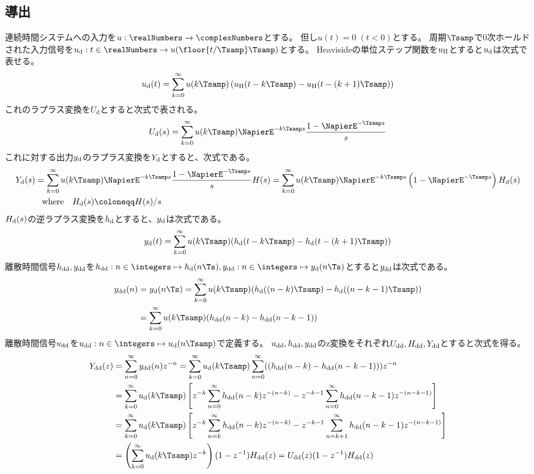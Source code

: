         \subsection{導出}
            連続時間システムへの入力を$u:\realNumbers\to\complexNumbers$とする。
            但し$u(t)=0\;(t<0)$とする。
            周期$\Tsamp$で0次ホールドされた入力信号を$\ud:t\in\realNumbers\to u(\floor{t/\Tsamp}\Tsamp)$とする。
            Heavisideの単位ステップ関数を$u_\text{H}$とすると$u_\text{d}$は次式で表せる。
            \[ \ud(t) = \sum_{k=0}^\infty u(k\Tsamp)\left(\uH(t-k\Tsamp) - \uH(t-(k+1)\Tsamp)\right) \]
            これのラプラス変換を$U_\text{d}$とすると次式で表される。
            \[ \Ud(s) = \sum_{k=0}^\infty u(k\Tsamp)\NapierE^{-k\Tsamp s}\frac{1-\NapierE^{-\Tsamp s}}{s} \]
            これに対する出力$y_\text{d}$のラプラス変換を$Y_\text{d}$とすると、次式である。
            \begin{align*}
                \Yd(s) &= \sum_{k=0}^\infty u(k\Tsamp)\NapierE^{-k\Tsamp s}\frac{1-\NapierE^{-\Tsamp s}}{s}H(s) = \sum_{k=0}^\infty u(k\Tsamp)\NapierE^{-k\Tsamp s}\left(1-\NapierE^{-\Tsamp s}\right)\Hd(s) \\
                &\phantom{=} \text{where} \quad \Hd(s) \coloneqq H(s)/s
            \end{align*}
            $H_\text{d}(s)$の逆ラプラス変換を$h_\text{d}$とすると、$y_\text{d}$は次式である。
            \[ \yd(t) = \sum_{k=0}^\infty u(k\Tsamp)(\hd(t-k\Tsamp)-\hd(t-(k+1)\Tsamp)) \]
            離散時間信号$h_\text{dd},y_\text{dd}$を$\hdd:n\in\integers\mapsto \hd(n\Ts),\ydd:n\in\integers\mapsto \yd(n\Ts)$とすると$y_\text{dd}$は次式である。
            \begin{align*}
                \ydd(n) &= \yd(n\Ts) = \sum_{k=0}^\infty u(k\Tsamp)(\hd((n-k)\Tsamp)-\hd((n-k-1)\Tsamp)) \\
                &= \sum_{k=0}^\infty u(k\Tsamp)(\hdd(n-k)-\hdd(n-k-1))
            \end{align*}
            離散時間信号$u_\text{dd}$を$\udd:n\in\integers\mapsto\ud(n\Tsamp)$で定義する。
            $u_\text{dd},h_\text{dd},y_\text{dd}$のz変換をそれぞれ$U_\text{dd},H_\text{dd},Y_\text{dd}$とすると次式を得る。
            \begin{align*}
                \Ydd(z) &= \sum_{n=0}^\infty \ydd(n) z^{-n} = \sum_{k=0}^\infty \ud(k\Tsamp) \sum_{n=0}^\infty ((\hdd(n-k)-\hdd(n-k-1))) z^{-n} \\
                &= \sum_{k=0}^\infty \ud(k\Tsamp)\left[z^{-k}\sum_{n=0}^\infty \hdd(n-k)z^{-(n-k)} - z^{-k-1}\sum_{n=0}^\infty \hdd(n-k-1)z^{-(n-k-1)}\right] \\
                &= \sum_{k=0}^\infty \ud(k\Tsamp)\left[z^{-k}\sum_{n=k}^\infty \hdd(n-k)z^{-(n-k)} - z^{-k-1}\sum_{n=k+1}^\infty \hdd(n-k-1)z^{-(n-k-1)}\right] \\
                &= \left(\sum_{k=0}^\infty \ud(k\Tsamp)z^{-k}\right)(1-z^{-1})\Hdd(z) = \Udd(z)(1-z^{-1})\Hdd(z)
            \end{align*}
